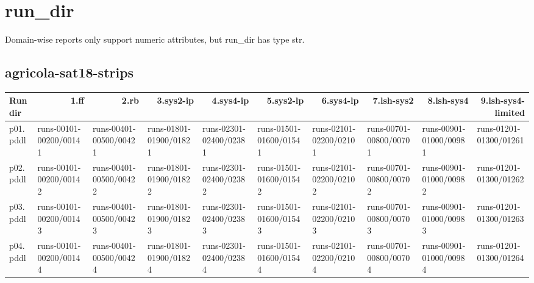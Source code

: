\documentclass{article}
\begin{document}
\hypertarget{run_dir}{}
\section*{run\_dir}

Domain-wise reports only support numeric attributes, but run\_dir has type str.

\hypertarget{run_dir-agricola-sat18-strips}{}
\subsection*{agricola-sat18-strips}

\begin{tabular}{@{}lrrrrrrrrr@{}}
Run dir & 1.ff & 2.rb & 3.sys2-ip & 4.sys4-ip & 5.sys2-lp & 6.sys4-lp & 7.lsh-sys2 & 8.lsh-sys4 & 9.lsh-sys4-limited \\
\midrule
p01.pddl & \multicolumn{1}{|l|}{runs-00101-00200/00141} & \multicolumn{1}{|l|}{runs-00401-00500/00421} & \multicolumn{1}{|l|}{runs-01801-01900/01821} & \multicolumn{1}{|l|}{runs-02301-02400/02381} & \multicolumn{1}{|l|}{runs-01501-01600/01541} & \multicolumn{1}{|l|}{runs-02101-02200/02101} & \multicolumn{1}{|l|}{runs-00701-00800/00701} & \multicolumn{1}{|l|}{runs-00901-01000/00981} & \multicolumn{1}{|l|}{runs-01201-01300/01261} \\
p02.pddl & \multicolumn{1}{|l|}{runs-00101-00200/00142} & \multicolumn{1}{|l|}{runs-00401-00500/00422} & \multicolumn{1}{|l|}{runs-01801-01900/01822} & \multicolumn{1}{|l|}{runs-02301-02400/02382} & \multicolumn{1}{|l|}{runs-01501-01600/01542} & \multicolumn{1}{|l|}{runs-02101-02200/02102} & \multicolumn{1}{|l|}{runs-00701-00800/00702} & \multicolumn{1}{|l|}{runs-00901-01000/00982} & \multicolumn{1}{|l|}{runs-01201-01300/01262} \\
p03.pddl & \multicolumn{1}{|l|}{runs-00101-00200/00143} & \multicolumn{1}{|l|}{runs-00401-00500/00423} & \multicolumn{1}{|l|}{runs-01801-01900/01823} & \multicolumn{1}{|l|}{runs-02301-02400/02383} & \multicolumn{1}{|l|}{runs-01501-01600/01543} & \multicolumn{1}{|l|}{runs-02101-02200/02103} & \multicolumn{1}{|l|}{runs-00701-00800/00703} & \multicolumn{1}{|l|}{runs-00901-01000/00983} & \multicolumn{1}{|l|}{runs-01201-01300/01263} \\
p04.pddl & \multicolumn{1}{|l|}{runs-00101-00200/00144} & \multicolumn{1}{|l|}{runs-00401-00500/00424} & \multicolumn{1}{|l|}{runs-01801-01900/01824} & \multicolumn{1}{|l|}{runs-02301-02400/02384} & \multicolumn{1}{|l|}{runs-01501-01600/01544} & \multicolumn{1}{|l|}{runs-02101-02200/02104} & \multicolumn{1}{|l|}{runs-00701-00800/00704} & \multicolumn{1}{|l|}{runs-00901-01000/00984} & \multicolumn{1}{|l|}{runs-01201-01300/01264} \\

\end{tabular}
\end{document}
